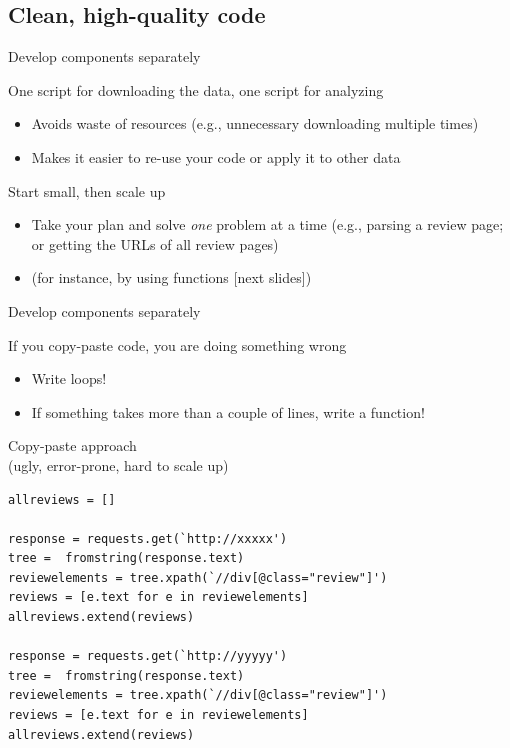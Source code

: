 \documentclass[handout]{beamer}
\begin{document}
\subsection{Clean, high-quality code}
\begin{frame}{Develop components separately}
	\begin{block}{One script for downloading the data, one script for analyzing}
		\begin{itemize}[<+->]
			\item Avoids waste of resources (e.g., unnecessary downloading multiple times)
			\item Makes it easier to re-use your code or apply it to other data
		\end{itemize}
	\end{block}
\pause
\begin{block}{Start small, then scale up}
	\begin{itemize}[<+->]
		\item Take your plan and solve \textit{one} problem at a time (e.g., parsing a review page; or getting the URLs of all review pages)
		\item (for instance, by using functions [next slides])
	\end{itemize}
\end{block}

\end{frame}	

\begin{frame}{Develop components separately}
	\begin{block}{If you copy-paste code, you are doing something wrong}
		\begin{itemize}[<+->]
			\item Write loops!
			\item If something takes more than a couple of lines, write a function!
		\end{itemize}
	\end{block}
\end{frame}

\begin{frame}
Copy-paste approach\\ (ugly, error-prone, hard to scale up)
\begin{lstlisting}
allreviews = []

response = requests.get(`http://xxxxx')
tree =  fromstring(response.text)
reviewelements = tree.xpath(`//div[@class="review"]')
reviews = [e.text for e in reviewelements]
allreviews.extend(reviews)

response = requests.get(`http://yyyyy')
tree =  fromstring(response.text)
reviewelements = tree.xpath(`//div[@class="review"]')
reviews = [e.text for e in reviewelements]
allreviews.extend(reviews)
\end{lstlisting}
\end{frame}
\end{document}
